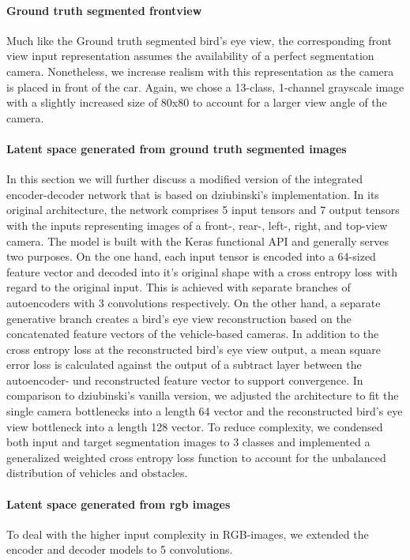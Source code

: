 \documentclass[letterpaper, 10 pt, conference]{ieeeconf}  %
\begin{document}
\paragraph{Ground truth segmented frontview}
Much like the Ground truth segmented bird's eye view, the corresponding front view input representation assumes the availability of a 
perfect segmentation camera. Nonetheless, we increase realism with this representation as the camera is placed in front of the car.
Again, we chose a 13-class, 1-channel grayscale image with a slightly increased size of 80x80 to account for a larger view angle of the 
camera. 
\paragraph{Latent space generated from ground truth segmented images}
In this section we will further discuss a modified version of the integrated encoder-decoder network that is based on 
dziubinski's \cite{dziubinskiSemanticSegmentationSemantic2019} implementation. In its original architecture, the network comprises 
5 input tensors and 7 output tensors with the inputs representing images of a front-, rear-, left-, right, and top-view camera. The 
model is built with the Keras functional API and generally serves two purposes. On the one hand, each input tensor is encoded into 
a 64-sized feature vector and decoded into it's original shape with a cross entropy loss with regard to the original input. This is 
achieved with separate branches of autoencoders with 3 convolutions respectively. On the other 
hand, a separate generative branch creates a bird's eye view reconstruction based on the concatenated feature vectors of the 
vehicle-based cameras. In addition to the cross entropy loss at the reconstructed bird's eye view output, a mean square error 
loss is calculated against the output of a subtract layer between the autoencoder- und reconstructed feature vector to support
convergence.
\newline In comparison to dziubinski's \cite{dziubinskiSemanticSegmentationSemantic2019} vanilla version, we 
adjusted the architecture to fit the single camera bottlenecks into a length 64 vector and the reconstructed bird's eye view
bottleneck into a length 128 vector. To reduce complexity, we condensed both input and target segmentation images to 3 classes 
and implemented a generalized weighted cross entropy\cite{zhangGeneralizedCrossEntropy2018} loss function to 
account for the unbalanced distribution of vehicles and obstacles.
\paragraph{Latent space generated from rgb images} To deal with the higher input complexity in RGB-images, we extended the
encoder and decoder models to 5 convolutions.
\end{document}
